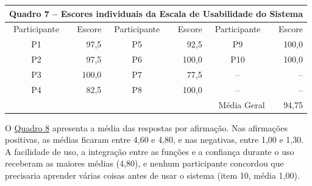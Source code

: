\begin{table}[H]
    \centering
    \hypertarget{quadro:escores_sus}{}\label{quadro:escores_sus}
    \small
    \renewcommand{\arraystretch}{1.15}
    \begin{tabular}{|c|r|c|r|c|r|}
        \hline
        \multicolumn{6}{|c|}{Quadro 7 -- Escores individuais da Escala de Usabilidade do Sistema} \\ \hline
        Participante & Escore &
        Participante & Escore &
        Participante & Escore \\ \hline
        P1 & 97,5 & P5 & 92,5 & P9 & 100,0 \\ \hline
        P2 & 97,5 & P6 & 100,0 & P10 & 100,0 \\ \hline
        P3 & 100,0 & P7 & 77,5 & -- & -- \\ \hline
        P4 & 82,5 & P8 & 100,0 & -- & -- \\ \hline
        \multicolumn{5}{|r|}{Média Geral} & 94,75 \\ \hline
    \end{tabular}
\end{table}

O \hyperref[quadro:medias_itens_sus]{Quadro 8} apresenta a média das respostas por afirmação. Nas afirmações positivas, as médias ficaram entre 4,60 e 4,80, e nas negativas, entre 1,00 e 1,30. A facilidade de uso, a integração entre as funções e a confiança durante o uso receberam as maiores médias (4,80), e nenhum participante concordou que precisaria aprender várias coisas antes de usar o sistema (item 10, média 1,00).

